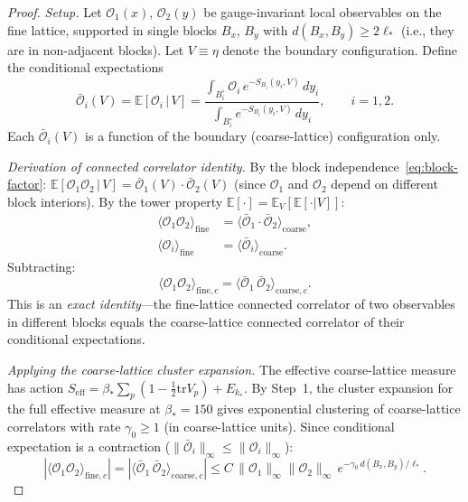 \documentclass[11pt]{article}
\theoremstyle{definition}
\newcommand{\tr}{\mathrm{tr}}
\begin{document}
\begin{proof}
\emph{Setup.}
Let $\mathcal{O}_1(x)$, $\mathcal{O}_2(y)$ be gauge-invariant local
observables on the fine lattice, supported in single blocks
$B_x$, $B_y$ with $d(B_x,B_y)\ge 2\ell_*$ (i.e., they are in
non-adjacent blocks).  Let $V\equiv\eta$ denote the boundary
configuration.  Define the conditional expectations
\begin{equation}
\bar{\mathcal{O}}_i(V)
=\mathbb{E}[\mathcal{O}_i\,|\,V]
=\frac{\int_{B_i^\circ}\mathcal{O}_i\,
e^{-S_{B_i}(y_i,V)}\,dy_i}
{\int_{B_i^\circ}e^{-S_{B_i}(y_i,V)}\,dy_i},
\qquad i=1,2.
\end{equation}
Each $\bar{\mathcal{O}}_i(V)$ is a function of the boundary
(coarse-lattice) configuration only.

\emph{Derivation of connected correlator identity.}
By the block independence~\eqref{eq:block-factor}:
$\mathbb{E}[\mathcal{O}_1\mathcal{O}_2\,|\,V]
=\bar{\mathcal{O}}_1(V)\cdot\bar{\mathcal{O}}_2(V)$
(since $\mathcal{O}_1$ and $\mathcal{O}_2$ depend on different
block interiors).
By the tower property
$\mathbb{E}[\cdot]=\mathbb{E}_V[\mathbb{E}[\cdot|V]]$:
\begin{align}
\langle\mathcal{O}_1\mathcal{O}_2\rangle_{\mathrm{fine}}
&=\langle\bar{\mathcal{O}}_1\cdot\bar{\mathcal{O}}_2
\rangle_{\mathrm{coarse}},\label{eq:tower-prod}\\
\langle\mathcal{O}_i\rangle_{\mathrm{fine}}
&=\langle\bar{\mathcal{O}}_i\rangle_{\mathrm{coarse}}.
\label{eq:tower-single}
\end{align}
Subtracting:
\begin{equation}\label{eq:fine-to-coarse}
\langle\mathcal{O}_1\mathcal{O}_2\rangle_{\mathrm{fine},c}
=\langle\bar{\mathcal{O}}_1\,\bar{\mathcal{O}}_2
\rangle_{\mathrm{coarse},c}.
\end{equation}
This is an \emph{exact identity}---the fine-lattice connected
correlator of two observables in different blocks equals the
coarse-lattice connected correlator of their conditional
expectations.

\emph{Applying the coarse-lattice cluster expansion.}
The effective coarse-lattice measure has action
$S_{\mathrm{eff}}=\beta_*\sum_p(1-\frac{1}{2}\tr V_p)+E_{k_*}$.
By Step~1, the cluster expansion for the full effective
measure at $\beta_*=150$ gives
exponential clustering of coarse-lattice correlators with
rate $\gamma_0\ge 1$ (in coarse-lattice units).
Since conditional expectation is a contraction
($\|\bar{\mathcal{O}}_i\|_\infty\le\|\mathcal{O}_i\|_\infty$):
\begin{equation}
|\langle\mathcal{O}_1\mathcal{O}_2\rangle_{\mathrm{fine},c}|
=|\langle\bar{\mathcal{O}}_1\,\bar{\mathcal{O}}_2
\rangle_{\mathrm{coarse},c}|
\le C\,\|\mathcal{O}_1\|_\infty\|\mathcal{O}_2\|_\infty\,
e^{-\gamma_0\,d(B_x,B_y)/\ell_*}.
\end{equation}


\end{proof}
\end{document}
